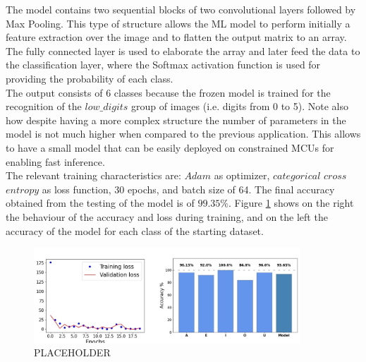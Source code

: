 \documentclass[12pt]{report}
\begin{document}
The model contains two sequential blocks of two convolutional layers followed by Max Pooling. This type of structure allows the ML model to perform initially a feature extraction over the image and to flatten the output matrix to an array. The fully connected layer is used to elaborate the array and later feed the data to the classification layer, where the Softmax activation function is used for providing the probability of each class.\\
The output consists of 6 classes because the frozen model is trained for the recognition of the $low\_ digits$ group of images (i.e. digits from 0 to 5). Note also how despite having a more complex structure the number of parameters in the model is not much higher when compared to the previous application. This allows to have a small model that can be easily deployed on constrained MCUs for enabling fast inference. \\
The relevant training characteristics are: $Adam$ as optimizer, $categorical$ $cross$ $entropy$ as loss function, 30 epochs, and batch size of 64. The final accuracy obtained from the testing of the model is of $99.35\%$. Figure \ref{fig:training_mnist} shows on the right the behaviour of the accuracy and loss during training, and on the left the accuracy of the model for each class of the starting dataset.

\begin{figure}[h!]
    \centering
    \includegraphics[width=100mm]{Figures/Chapter4/training_letters.jpg} 
    \caption{PLACEHOLDER}
    \label{fig:training_mnist}    
\end{figure}
\end{document}
